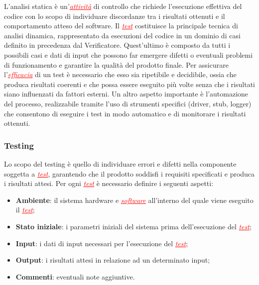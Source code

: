 L'analisi statica è un'\textcolor{red}{\uline{\textit{attività}}} di controllo che richiede l'esecuzione effettiva del codice con lo scopo di
individuare discordanze tra i risultati ottenuti e il comportamento atteso del software. Il \textcolor{red}{\uline{\textit{test}}} costituisce
la principale tecnica di analisi dinamica, rappresentato da esecuzioni del codice in un dominio di casi definito in precedenza dal Verificatore.
Quest'ultimo è composto da tutti i possibili casi e dati di input che possono far emergere difetti o eventuali problemi di funzionamento e
garantire la qualità del prodotto finale. Per assicurare l'\textcolor{red}{\uline{\textit{efficacia}}} di un test è necessario
che esso sia ripetibile e decidibile, ossia che produca risultati coerenti e che possa essere eseguito più volte senza che 
i risultati siano influenzati da fattori esterni. Un altro aspetto importante è l'automazione del processo, realizzabile tramite l'uso di
strumenti specifici (driver, stub, logger) che consentono di eseguire i test in modo automatico e di monitorare i risultati ottenuti.

\subsubsection{Testing} \label{testing}
Lo scopo del testing è quello di individuare errori e difetti nella componente soggetta a \textcolor{red}{\uline{\textit{test}}},
garantendo che il prodotto soddisfi i requisiti specificati e produca i risultati attesi. Per ogni \textcolor{red}{\uline{\textit{test}}}
è necessario definire i seguenti aspetti:
\begin{itemize}
    \item \textbf{Ambiente}: il sistema hardware e \textcolor{red}{\uline{\textit{software}}} all'interno del quale viene eseguito il \textcolor{red}{\uline{\textit{test}}};
    \item \textbf{Stato iniziale}: i parametri iniziali del sistema prima dell'esecuzione del \textcolor{red}{\uline{\textit{test}}};
    \item \textbf{Input}: i dati di input necessari per l'esecuzione del \textcolor{red}{\uline{\textit{test}}};
    \item \textbf{Output}: i risultati attesi in relazione ad un determinato input;
    \item \textbf{Commenti}: eventuali note aggiuntive.
\end{itemize}

